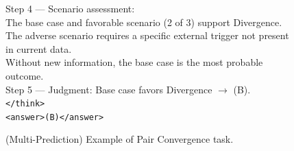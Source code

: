 \begin{figure}[h]
\begin{minipage}{0.95\textwidth}
{{Step 4 --- Scenario assessment: \\
The base case and favorable scenario (2 of 3) support Divergence. \\
The adverse scenario requires a specific external trigger not present in current data. \\
Without new information, the base case is the most probable outcome. \\[6pt]
Step 5 --- Judgment: Base case favors Divergence $\rightarrow$ (B). \\[4pt]
\texttt{</think>} \\
\texttt{<answer>(B)</answer>}
}}
\end{minipage}
\caption{(Multi-Prediction) Example of Pair Convergence task.}
\end{figure}




